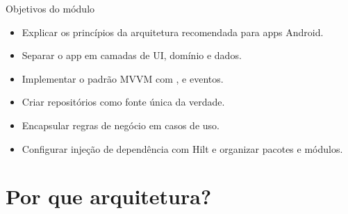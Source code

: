 \documentclass[aspectratio=169,10pt]{beamer}
\begin{document}
\capa

\begin{frame}{Objetivos do módulo}
  \begin{conceito}
    \begin{itemize}
      \item Explicar os princípios da arquitetura recomendada para apps Android.
      \item Separar o app em camadas de UI, domínio e dados.
      \item Implementar o padrão MVVM com ,  e eventos.
      \item Criar repositórios como fonte única da verdade.
      \item Encapsular regras de negócio em casos de uso.
      \item Configurar injeção de dependência com Hilt e organizar pacotes e módulos.
    \end{itemize}
  \end{conceito}
\end{frame}

\sumario

\section{Por que arquitetura?}
\end{document}
